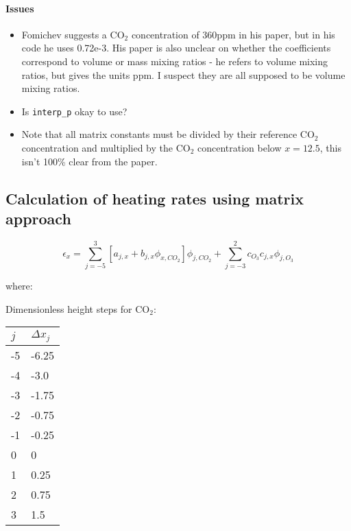    \paragraph{Issues}
   \begin{itemize}
   \item Fomichev suggests a CO$_2$ concentration of 360ppm in his paper, but
     in his code he uses 0.72e-3. His paper is also unclear on whether the 
     coefficients correspond to volume or mass mixing ratios - he refers
     to volume mixing ratios, but gives the units ppm. I suspect they are
     all supposed to be volume mixing ratios.
   \item Is {\tt interp\_p} okay to use?
   \item Note that all matrix constants must be divided by their reference
     CO$_2$ concentration and multiplied by the CO$_2$ concentration below 
     $x=12.5$, this isn't 100\% clear from the paper.
   \end{itemize}


\subsection{Calculation of heating rates using matrix approach}

   $$\epsilon_x = \sum_{j=-5}^{3}[a_{j,x} + b_{j,x}\phi_{x,CO_2}]\phi_{j,CO_2}
   + \sum_{j=-3}^{2} c_{O_3}c_{j,x}\phi_{j,O_3}$$

   where:
   
   Dimensionless height steps for CO$_2$:
   \begin{table}[H]
     \begin{tabular}{ll}\hline
       \textbf{$j$} & \textbf{$\Delta x_j$} \\
       \hline
       -5           & -6.25                 \\
       -4           & -3.0                  \\
       -3           & -1.75                 \\
       -2           & -0.75                 \\
       -1           & -0.25                 \\
       0            & 0                     \\
       1            & 0.25                  \\
       2            & 0.75                  \\
       3            & 1.5                   \\
       \hline
     \end{tabular}
   \end{table}

